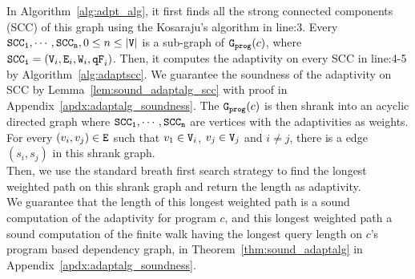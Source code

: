    In Algorithm~\ref{alg:adpt_alg}, 
    it first finds all the strong connected components (SCC) of this graph using the Kosaraju’s algorithm in line:3.
    Every $\mathtt{SCC_1}, \cdots, \mathtt{SCC_n}, 0 \leq n \leq |\mathtt{V}|$ is a sub-graph of $\mathtt{{G_{prog}}}(c)$, where $\mathtt{SCC_i} = (\mathtt{V}_i, \mathtt{E}_i, \mathtt{W}_i, \mathtt{qF}_i)$.
    Then, 
    it computes the adaptivity on every SCC
    in line:4-5 by Algorithm~\ref{alg:adaptscc}.
    We guarantee the soundness of the adaptivity on SCC by Lemma~\ref{lem:sound_adaptalg_scc} with proof in Appendix~\ref{apdx:adaptalg_soundness}.
    The $\mathtt{{G_{prog}}}(c)$ is then shrank into an acyclic directed graph where 
    $\mathtt{SCC_1}, \cdots, \mathtt{SCC_n}$ are vertices with the adaptivities as weights.
    For every $(v_i, v_j) \in \mathtt{E}$ such that $v_1 \in \mathtt{V}_i$, $v_j \in \mathtt{V}_j$ and $i \neq j$,
    there is a edge $(s_i, s_j)$ in this shrank graph. \\ 
    Then, we use the standard breath first search strategy to find the longest weighted path
    on this shrank graph and return the length as adaptivity.
    \\
    We guarantee that 
    the length of this longest weighted path is a sound computation of the adaptivity for program $c$,
    and this longest weighted path a sound computation of the finite walk having the longest query length 
    on $c$'s program based dependency graph, in Theorem~\ref{thm:sound_adaptalg}
    in Appendix~\ref{apdx:adaptalg_soundness}.
%    
